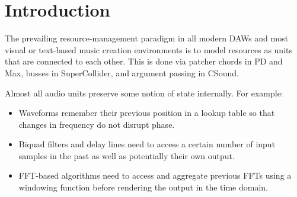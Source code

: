 \documentclass{article}
\title{\papertitle}
\begin{document}
%
\capstartfalse
\maketitle
\capstarttrue
%
\begin{abstract}
Audio programming languages fall into two broad categories: imperative (CSound, sclang) and functional (Faust, tidal). For the latter, the declarative and immutable nature of data and control structures are often at odds with the mutable and referentially opaque nature of audio units like oscillators and filters. Recently, languages such as Rust have bridged this chasm through zero-cost abstractions that manage resource allocation in otherwise functional settings. In the same spirit, this paper presents a zero-cost abstraction for the management of audio units when working with pure audio rendering functions. The result is automatic audio memory management that incurs minimal runtime penalty while retaining an expressive functional syntax.
\end{abstract}
%

\section{Introduction}\label{sec:introduction}
The prevailing resource-management paradigm in all modern DAWs and most visual or text-based music creation environments is to model resources as units that are connected to each other. This is done via patcher chords in PD and Max, busses in SuperCollider, and argument passing in CSound.



Almost all audio units preserve some notion of state internally. For example:

\begin{itemize}
\item Waveforms remember their previous position in a lookup table so that changes in frequency do not disrupt phase.
\item Biquad filters and delay lines need to access a certain number of input samples in the past as well as potentially their own output.
\item FFT-based algorithms need to access and aggregate previous FFTs using a windowing function before rendering the output in the time domain.
\end{itemize}
\end{document}
